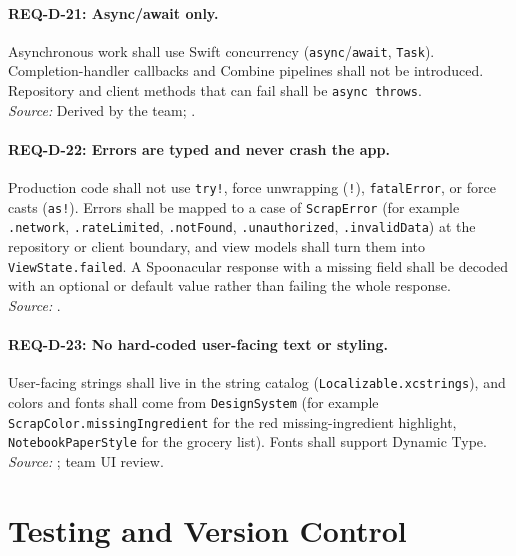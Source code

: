 \paragraph{REQ-D-21: Async/await only.}
 Asynchronous work shall use Swift concurrency (\texttt{async}/\texttt{await}, \texttt{Task}). Completion-handler callbacks and Combine pipelines shall not be introduced. Repository and client methods that can fail shall be \texttt{async throws}.\\
\textit{Source:} Derived by the team; .

\paragraph{REQ-D-22: Errors are typed and never crash the app.}
 Production code shall not use \texttt{try!}, force unwrapping (\texttt{!}), \texttt{fatalError}, or force casts (\texttt{as!}). Errors shall be mapped to a case of \texttt{ScrapError} (for example \texttt{.network}, \texttt{.rateLimited}, \texttt{.notFound}, \texttt{.unauthorized}, \texttt{.invalidData}) at the repository or client boundary, and view models shall turn them into \texttt{ViewState.failed}. A Spoonacular response with a missing field shall be decoded with an optional or default value rather than failing the whole response.\\
\textit{Source:} .

\paragraph{REQ-D-23: No hard-coded user-facing text or styling.}
 User-facing strings shall live in the string catalog (\texttt{Localizable.xcstrings}), and colors and fonts shall come from \texttt{DesignSystem} (for example \texttt{ScrapColor.missingIngredient} for the red missing-ingredient highlight, \texttt{NotebookPaperStyle} for the grocery list). Fonts shall support Dynamic Type.\\
\textit{Source:} ; team UI review.

\section{Testing and Version Control}

